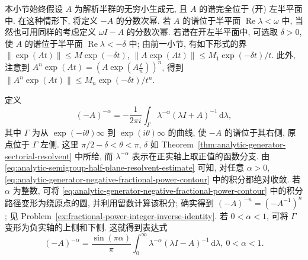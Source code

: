 本小节始终假设 $A$ 为解析半群的无穷小生成元, 且 $A$ 的谱完全位于 (开) 左半平面中. 在这种情形下, 将定义 $-A$ 的分数次幂. 若 $A$ 的谱位于半平面 $\operatorname{Re}\lambda<\omega$ 中, 当然也可用同样的考虑定义 $\omega I-A$ 的分数次幂. 若谱在开左半平面中, 可选取 $\delta>0$, 使 $A$ 的谱位于半平面 $\operatorname{Re}\lambda<-\delta$ 中; 由前一小节, 有如下形式的界 $\|\exp(At)\|\leq M\exp(-\delta t)$, $\|A\exp(At)\|\leq M_1\exp(-\delta t)/t$. 此外, 注意到 $A^n\exp(At)=(A\exp(A\frac{t}{n}))^n$, 得到 $\|A^n\exp(At)\|\leq M_n\exp(-\delta t)/t^n$.

定义
\begin{equation}\label{eq:analytic-generator-negative-fractional-power-contour}
(-A)^{-\alpha}=-\dfrac{1}{2\pi i}\int_\Gamma\lambda^{-\alpha}(\lambda I+A)^{-1}\,\mathrm{d}\lambda,
\end{equation}
其中 $\Gamma$ 为从 $\exp(-i\theta)\infty$ 到 $\exp(i\theta)\infty$ 的曲线, 使 $-A$ 的谱位于其右侧, 原点位于 $\Gamma$ 左侧. 这里 $\pi/2-\delta<\theta<\pi$, $\delta$ 如 Theorem~\ref{thm:analytic-generator-sectorial-resolvent} 中所给, 而 $\lambda^{-\alpha}$ 表示在正实轴上取正值的函数分支. 由 \eqref{eq:analytic-semigroup-half-plane-resolvent-estimate} 可知, 对任意 $\alpha>0$, \eqref{eq:analytic-generator-negative-fractional-power-contour} 中的积分都绝对收敛. 若 $\alpha$ 为整数, 可将 \eqref{eq:analytic-generator-negative-fractional-power-contour} 中的积分路径变形为绕原点的圆, 并利用留数计算该积分; 确实得到 $(-A)^{-n}=(-A^{-1})^n$; 见 Problem~\ref{ex:fractional-power-integer-inverse-identity}. 若 $0<\alpha<1$, 可将 $\Gamma$ 变形为负实轴的上侧和下侧. 这就得到表达式
\begin{equation}\label{eq:analytic-generator-negative-fractional-power-real-resolvent}
(-A)^{-\alpha}=\dfrac{\sin(\pi\alpha)}{\pi}\int_0^\infty\lambda^{-\alpha}(\lambda I-A)^{-1}\,\mathrm{d}\lambda,\ 0<\alpha<1.
\end{equation}


